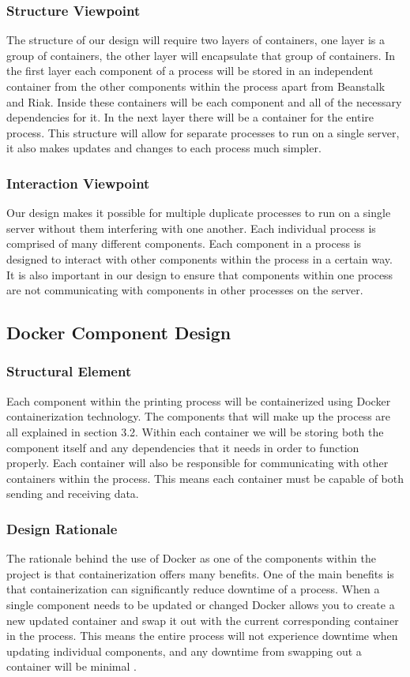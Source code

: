 \documentclass[onecolumn, draftclsnofoot,10pt, compsoc]{IEEEtran}
\begin{document}
\subsubsection{Structure Viewpoint}
The structure of our design will require two layers of containers, one layer is a group of containers, the other layer will encapsulate that group of containers. In the first layer each component of a process will be stored in an independent container from the other components within the process apart from Beanstalk and Riak. Inside these containers will be each component and all of the necessary dependencies for it. In the next layer there will be a container for the entire process. This structure will allow for separate processes to run on a single server, it also makes updates and changes to each process much simpler.
\subsubsection{Interaction Viewpoint}
Our design makes it possible for multiple duplicate processes to run on a single server without them interfering with one another. Each individual process is comprised of many different components. Each component in a process is designed to interact with other components within the process in a certain way. It is also important in our design to ensure that components within one process are not communicating with components in other processes on the server. 


\subsection{Docker Component Design}
\subsubsection{Structural Element}
Each component within the printing process will be containerized using Docker containerization technology. The components that will make up the process are all explained in section 3.2. Within each container we will be storing both the component itself and any dependencies that it needs in order to function properly. Each container will also be responsible for communicating with other containers within the process. This means each container must be capable of both sending and receiving data. 
\subsubsection{Design Rationale}
The rationale behind the use of Docker as one of the components within the project is that containerization offers many benefits. One of the main benefits is that containerization can significantly reduce downtime of a process. When a single component needs to be updated or changed Docker allows you to create a new updated container and swap it out with the current corresponding container in the process. This means the entire process will not experience downtime when updating individual components, and any downtime from swapping out a container will be minimal \cite{docker}. 
\end{document}
